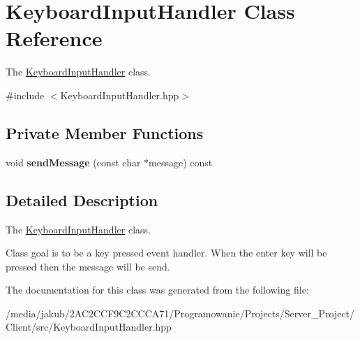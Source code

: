 \hypertarget{classKeyboardInputHandler}{}\section{Keyboard\+Input\+Handler Class Reference}
\label{classKeyboardInputHandler}


The \hyperlink{classKeyboardInputHandler}{Keyboard\+Input\+Handler} class.  




{\ttfamily \#include $<$Keyboard\+Input\+Handler.\+hpp$>$}

\subsection*{Private Member Functions}
\begin{DoxyCompactItemize}
\item 
\mbox{\label{classKeyboardInputHandler_a1b38304b0447df9595cd301931c8fc57}} 
void {\bfseries send\+Message} (const char $\ast$message) const
\end{DoxyCompactItemize}


\subsection{Detailed Description}
The \hyperlink{classKeyboardInputHandler}{Keyboard\+Input\+Handler} class. 

Class goal is to be a key pressed event handler. When the \textquotesingle{}enter\textquotesingle{} key will be pressed then the message will be send. 

The documentation for this class was generated from the following file\+:\begin{DoxyCompactItemize}
\item 
/media/jakub/2\+A\+C2\+C\+C\+F9\+C2\+C\+C\+C\+A71/\+Programowanie/\+Projects/\+Server\+\_\+\+Project/\+Client/src/Keyboard\+Input\+Handler.\+hpp\end{DoxyCompactItemize}
